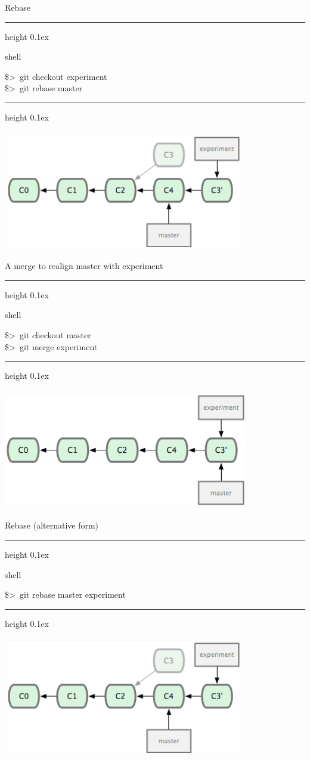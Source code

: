 \documentclass{beamer}
\newenvironment{shell}{%
\footnotesize\flushleft\hrule height 0.1ex
\tt\begin{beamercolorbox}[sep=1ex,left]{shell}%
}{%
\end{beamercolorbox}
\hrule height 0.1ex
\endflushleft\par
}
\newcommand*{\psone}[1][ant]{\$>~}
\begin{document}
\begin{frame}{Rebase}
\begin{shell}
\psone git checkout experiment\\
\psone git rebase master
\end{shell}
\begin{center}
\includegraphics[width=0.8\textwidth]{figures/rebase1}
\end{center}
\end{frame}
\begin{frame}{A merge to realign master with experiment}
\begin{shell}
\psone git checkout master\\
\psone git merge experiment
\end{shell}
\begin{center}
\includegraphics[width=0.8\textwidth]{figures/rebase2}\\
\end{center}
\end{frame}
\begin{frame}{Rebase (alternative form)}
\begin{shell}
\psone git rebase master experiment\\
\end{shell}
\begin{center}
\includegraphics[width=0.8\textwidth]{figures/rebase1}\\
\end{center}
\end{frame}
\end{document}

